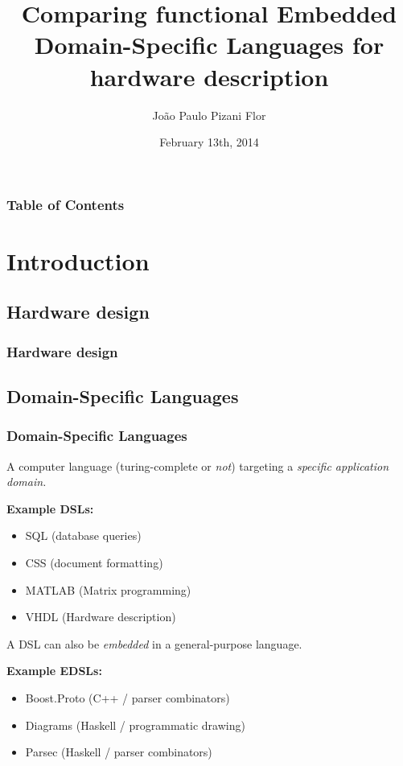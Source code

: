 \documentclass{beamer}
\title[Comparing functional EDSLs for hardware description]{Comparing functional Embedded Domain-Specific Languages for hardware description}
\date{February 13th, 2014}
\author[Pizani Flor]
{
    João Paulo Pizani Flor
}
\institute[Utrecht University]
{
    Department of Information and Computing Sciences,
    Utrecht University
}
\begin{document}
    \begin{frame}
        \titlepage
    \end{frame}

    \begin{frame}
        \frametitle{Table of Contents}
        \tableofcontents
    \end{frame}



    \section{Introduction}
    \label{sec:introduction}
        \frame{\sectionpage}

        \subsection{Hardware design}
        \label{subsec:hardware-design}
            \begin{frame}
                \frametitle{Hardware design}
            \end{frame}


        \subsection{Domain-Specific Languages}
        \label{subsec:domain-specific-languages}
            \begin{frame}
                \frametitle{Domain-Specific Languages}

                \par{A computer language (turing-complete or \emph{not}) targeting a \emph{specific application domain.}}
                \par{\textbf{Example DSLs:}}
                \begin{itemize}
                    \item SQL (database queries)
                    \item CSS (document formatting)
                    \item MATLAB (Matrix programming)
                    \item VHDL (Hardware description)
                \end{itemize}

                \pause

                \par{A DSL can also be \emph{embedded} in a general-purpose language.}
                \par{\textbf{Example EDSLs:}}
                \begin{itemize}
                    \item Boost.Proto (C++ / parser combinators)
                    \item Diagrams (Haskell / programmatic drawing)
                    \item Parsec (Haskell / parser combinators)
                \end{itemize}
            \end{frame}
\end{document}
